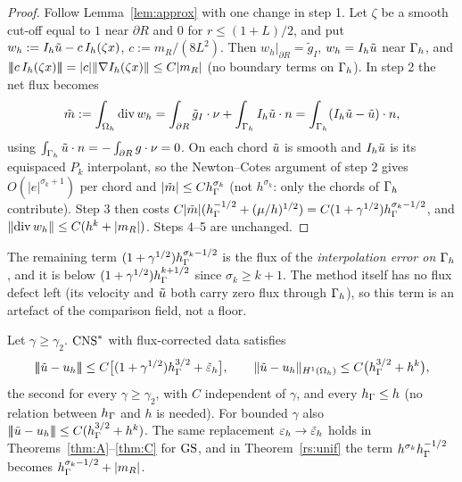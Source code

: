 \begin{proof}
Follow Lemma~\ref{lem:approx} with one change in step 1. Let $\zeta$ be a smooth cut-off equal to $1$ near $\partial R$ and $0$ for $r\le(1+L)/2$, and put $w_h:=I_h\tilde u-c\,I_h(\zeta x)$, $c:=m_R/(8L^2)$. Then $w_h|_{\partial R}=\tilde g_I$, $w_h=I_h\tilde u$ near $\Gamma_h$, and $|\!|\!|c\,I_h(\zeta x)|\!|\!|=|c|\lVert \nabla I_h(\zeta x)\rVert\le C|m_R|$ (no boundary terms on $\Gamma_h$). In step 2 the net flux becomes
\[
\tilde m:=\int_{\Omega_h}\operatorname{div} w_h=\int_{\partial R}\tilde g_I\cdot\nu+\int_{\Gamma_h}I_h\tilde u\cdot n=\int_{\Gamma_h}(I_h\tilde u-\tilde u)\cdot n ,
\]
using $\int_{\Gamma_h}\tilde u\cdot n=-\int_{\partial R}g\cdot\nu=0$. On each chord $\tilde u$ is smooth and $I_h\tilde u$ is its equispaced $P_k$ interpolant, so the Newton--Cotes argument of step 2 gives $O(|e|^{\sigma_k+1})$ per chord and $|\tilde m|\le Ch_\Gamma^{\sigma_k}$ (not $h^{\sigma_k}$: only the chords of $\Gamma_h$ contribute). Step 3 then costs $C|\tilde m|(h_\Gamma^{-1/2}+(\mu/h)^{1/2})=C(1+\gamma^{1/2})h_\Gamma^{\sigma_k-1/2}$, and $\lVert \operatorname{div} w_h\rVert\le C(h^k+|m_R|)$. Steps 4--5 are unchanged.
\end{proof}

The remaining term $(1+\gamma^{1/2})h_\Gamma^{\sigma_k-1/2}$ is the flux of the \emph{interpolation error on $\Gamma_h$}, and it is below $(1+\gamma^{1/2})h_\Gamma^{k+1/2}$ since $\sigma_k\ge k+1$. The method itself has no flux defect left (its velocity and $\tilde u$ both carry zero flux through $\Gamma_h$), so this term is an artefact of the comparison field, not a floor.

\begin{theorem}\label{rs:Dfc}
Let $\gamma\ge\gamma_2$. $\mathrm{CNS}^\ast$ with flux-corrected data satisfies
\[
|\!|\!|\tilde u-u_h|\!|\!|\le C\bigl[(1+\gamma^{1/2})h_\Gamma^{3/2}+\tilde\varepsilon_h\bigr],\qquad
\lVert \tilde u-u_h\rVert_{H^1(\Omega_h)}\le C\bigl(h_\Gamma^{3/2}+h^k\bigr),
\]
the second for every $\gamma\ge\gamma_2$, with $C$ independent of $\gamma$, and every $h_\Gamma\le h$ (no relation between $h_\Gamma$ and $h$ is needed). For bounded $\gamma$ also $|\!|\!|\tilde u-u_h|\!|\!|\le C(h_\Gamma^{3/2}+h^k)$. The same replacement $\varepsilon_h\to\tilde\varepsilon_h$ holds in Theorems~\ref{thm:A}--\ref{thm:C} for $\mathrm{GS}$, and in Theorem~\ref{rs:unif} the term $h^{\sigma_k}h_\Gamma^{-1/2}$ becomes $h_\Gamma^{\sigma_k-1/2}+|m_R|$.
\end{theorem}


